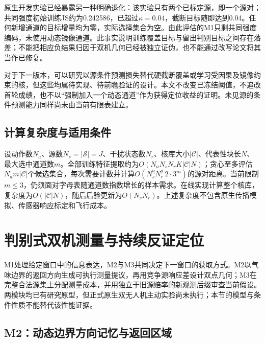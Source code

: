 原生开发实验已经暴露另一种明确退化：该实验只有两个已标定源，即一个源对；共同强度初始训练JS约为0.242586，已超过$\kappa=0.04$，截断目标随即达到0.04。任何新增通道的目标增量均为零，实际选择集合为空。由此评估的M1只剩共同强度编码，未使用动态镜像通道。此事实说明训练覆盖目标与留出判别目标之间存在落差；不能把相应负结果归因于双机几何已经被独立证伪，也不能通过改写论文将其当作已修复。

对于下一版本，可以研究以源条件预测损失替代硬截断覆盖或学习受因果及镜像约束的核，但这些均属待实现、待前瞻验证的设计。本文不改变已冻结阈值，不追改首轮成绩，也不以“强制加入一个动态通道”作为获得定位收益的证明。未见源的条件预测能力同样尚未由当前有限表建立。

\subsection{计算复杂度与适用条件}

设动作数$N_a$、源数$N_s=|\mathcal S|=J$、干扰状态数$N_r$、核库大小$|\mathcal C|$、代表性块长$N$、最大选中通道数$m$。全部训练特征提取约为$O(N_aN_sN_rK|\mathcal C|N)$；贪心至多评估$N_am|\mathcal C|$个候选集合，每次需要计数并计算$O(N_s^2N_r^2\,2\cdot3^m)$的源对距离。当前限制$m\le3$，仍须面对字母表随通道数指数增长的样本需求。在线实现计算整个核库，复杂度为$O(|\mathcal C|N)$，随后后验更新为$O(N_sN_r)$。上述复杂度不包含原生传播模拟、传感器响应标定和飞行成本。

\section{判别式双机测量与持续反证定位}
\label{sec:m2m3}

M1处理给定窗口中的信息表达，M2与M3共同决定下一窗口的获取方式。M2以气味边界的返回方向生成可执行测量提议，再用竞争源响应差设计双点几何；M3在完整合法源集上分配测量成本，并用独立于旧源赔率的新观测后缀审查当前假设。两模块均已有研究原型，但正式原生双无人机主动实验尚未执行；本节的模型与条件性质不能替代该性能证据。

\subsection{M2：动态边界方向记忆与返回区域}

